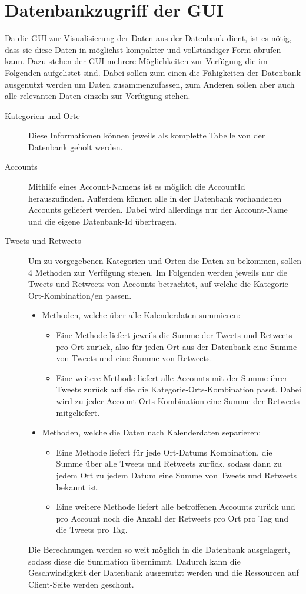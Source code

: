 \section{Datenbankzugriff der GUI}
Da die GUI zur Visualisierung der Daten aus der Datenbank dient, ist es nötig, dass sie diese Daten in möglichst kompakter und vollständiger Form abrufen kann. Dazu stehen der GUI mehrere Möglichkeiten zur Verfügung die im Folgenden aufgelistet sind. Dabei sollen zum einen die Fähigkeiten der Datenbank ausgenutzt werden um Daten zusammenzufassen, zum Anderen sollen aber auch alle relevanten Daten einzeln zur Verfügung stehen.
\begin{description}
\item[Kategorien und Orte] Diese Informationen können jeweils als komplette Tabelle von der Datenbank geholt werden.
\item[Accounts] Mithilfe eines Account-Namens ist es möglich die AccountId herauszufinden. Außerdem können alle in der Datenbank vorhandenen Accounts geliefert werden. Dabei wird allerdings nur der Account-Name und die eigene Datenbank-Id übertragen.
\item[Tweets und Retweets] Um zu vorgegebenen Kategorien und Orten die Daten zu bekommen, sollen 4 Methoden zur Verfügung stehen. Im Folgenden werden jeweils nur die Tweets und Retweets von Accounts betrachtet, auf welche die Kategorie-Ort-Kombination/en passen.

\begin{itemize}
	\item Methoden, welche über alle Kalenderdaten summieren:
	\begin{itemize}
		\item Eine Methode liefert jeweils die Summe der Tweets und Retweets pro Ort zurück, also für jeden Ort aus der Datenbank eine Summe von Tweets und eine Summe von Retweets.
		\item Eine weitere Methode liefert alle Accounts mit der Summe ihrer Tweets zurück auf die die Kategorie-Orts-Kombination passt. Dabei wird zu jeder Account-Orts Kombination eine Summe der Retweets mitgeliefert.
	\end{itemize}
	\item Methoden, welche die Daten nach Kalenderdaten separieren:
	\begin{itemize}
		\item Eine Methode liefert für jede Ort-Datums Kombination, die Summe über alle Tweets und Retweets zurück, sodass dann zu jedem Ort zu jedem Datum eine Summe von Tweets und Retweets bekannt ist.
		\item Eine weitere Methode liefert alle betroffenen Accounts zurück und pro Account noch die Anzahl der Retweets pro Ort pro Tag und die Tweets pro Tag.
	\end{itemize}
\end{itemize}
Die Berechnungen werden so weit möglich in die Datenbank ausgelagert, sodass diese die Summation übernimmt. Dadurch kann die Geschwindigkeit der Datenbank ausgenutzt werden und die Ressourcen auf Client-Seite werden geschont.


\end{description}